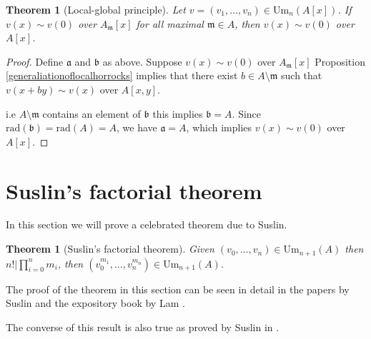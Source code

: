 \documentclass[12pt]{report}
\numberwithin{equation}{section}
\newcounter{dummy} \numberwithin{dummy}{section}
\newtheorem{theorem}[dummy]{Theorem}
\begin{document}
	\begin{theorem}[Local-global principle]\label{localglobalprinciple}
		Let $v = (v_1, \dots, v_n) \in \mathrm{Um}_n(A[x])$. If $v(x) \sim v(0)$ over $A_{\mathfrak{m}}[x]$ for all maximal $\mathfrak{m} \in A$, then $v(x) \sim v(0)$ over $A[x]$.
	\end{theorem}
	
	\begin{proof}
		Define $\mathfrak{a}$ and $\mathfrak{b}$ as above. Suppose $v(x) \sim v(0)$ over $A_\mathfrak{m}[x]$ Proposition \ref{generaliationoflocalhorrocks} implies that there exist $b \in A \setminus \mathfrak m$ such that $v(x+by) \sim v(x)$ over $A[x,y]$.
		
		i.e $A\setminus \mathfrak{m}$ contains an element of $\mathfrak{b}$ this implies $\mathfrak{b} = A$.  Since $\mathrm{rad}(\mathfrak{b})= \mathrm{rad}(A)=A$, we have $\mathfrak{a} = A$, which implies $v(x) \sim v(0)$ over $A[x]$.
	\end{proof}
		
		\section{Suslin's factorial theorem}	
		In this section we will prove a celebrated theorem due to Suslin. \begin{theorem}[Suslin's factorial theorem]\label{suslinfactorial}
			Given $(v_0,\dots,v_n) \in \mathrm{Um}_{n+1}(A)$ then $n! | \prod_{i=0}^n m_i$, then $(v_0^{m_1}, \dots, v_n^{m_n}) \in \mathrm{Um}_{n+1}(A).$ 
		\end{theorem}
		
			The proof of the theorem in this section can be seen in detail in the papers by Suslin \cite{suslin1977} and the expository book by Lam \cite{lam2010serre}. 
			
			The converse of this result is also true as proved by Suslin in \cite{suslin1982}. 
			
\end{document}
